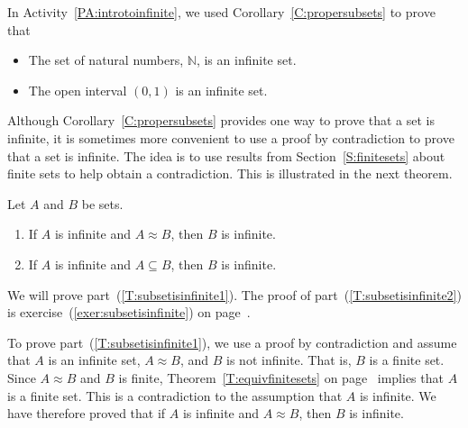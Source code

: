 \newpar
In \typeu Activity~\ref*{PA:introtoinfinite}, we used Corollary~\ref{C:propersubsets} to prove that
\begin{itemize}
\item The set of natural numbers, $\mathbb{N}$, is an infinite set.

\item The open interval $( 0, 1 )$ is an infinite set.
\end{itemize}
Although Corollary~\ref{C:propersubsets} provides one way to prove that a set is infinite, it is sometimes more convenient to use a proof by contradiction to prove that a set is infinite.  The idea is to use results from Section~\ref{S:finitesets} about finite sets to help obtain a contradiction.  This is illustrated in the next theorem.
\begin{theorem}\label{T:subsetisinfinite}
Let $A$ and $B$ be sets.
\begin{enumerate}
\item If $A$ is infinite and $A \approx B$, then $B$ is infinite.  \label{T:subsetisinfinite1}
\item If $A$ is infinite and $A \subseteq B$, then $B$ is infinite.  \label{T:subsetisinfinite2}
\end{enumerate}
\end{theorem}
%
\begin{myproof}
We will prove part~(\ref{T:subsetisinfinite1}).  The proof of part~(\ref{T:subsetisinfinite2}) is exercise~(\ref{exer:subsetisinfinite}) on page~\pageref{exer:subsetisinfinite}.

To prove part~(\ref{T:subsetisinfinite1}), we use a proof by contradiction and assume that $A$ is an infinite set, $A \approx B$, and $B$ is not infinite.  That is, $B$ is a finite set.  Since $A \approx B$ and $B$ is finite, Theorem~\ref{T:equivfinitesets} on page~\pageref{T:equivfinitesets} implies that $A$ is a finite set.  This is a contradiction to the assumption that $A$ is infinite.  We have therefore proved that if $A$ is infinite and $A \approx B$, then $B$ is infinite.
\end{myproof}

